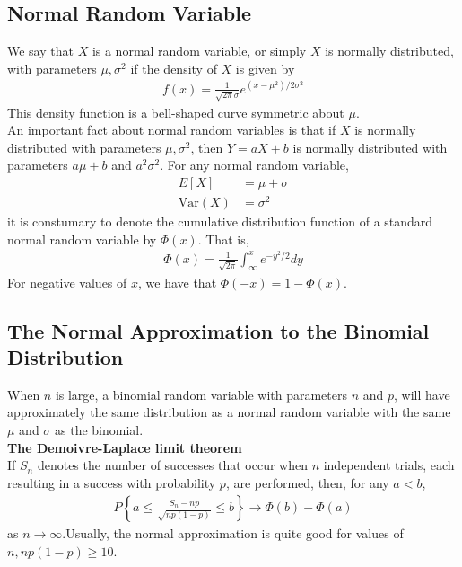 \documentclass[a4paper]{article}
\begin{document}
\subsection{Normal Random Variable} %
\label{sub:Normal Random Variable}
We say that $X$ is a normal random variable, or simply $X$ is normally distributed, with parameters $\mu,\sigma^2$ if the density of $X$ is given by
\begin{align}
  f(x) = \frac{1}{\sqrt{2 \pi}\sigma} e^{(x-\mu^2)/2\sigma^2}
\end{align}
This density function is a bell-shaped curve symmetric about $\mu$. \\
An important fact about normal random variables is that if $X$ is normally distributed with parameters $\mu,\sigma^2$, then $Y = aX+b$ is normally distributed with parameters $a\mu+b$ and $a^2\sigma^2$.
For any normal random variable,
\begin{align}
  E[X] & = \mu + \sigma \\
  \text{Var}(X) & = \sigma^2
\end{align}
it is constumary to denote the cumulative distribution function of a standard normal random variable by $\Phi(x)$. That is,
\begin{align}
  \Phi(x) = \frac{1}{\sqrt{2\pi}}\int_{\infty}^{x} e^{-y^2/2} dy
\end{align}
For negative values of $x$, we have that $\Phi(-x)=1-\Phi(x)$.
\subsection{The Normal Approximation to the Binomial Distribution} %
\label{sub:The Normal Approximation to the Binomial Distribution}
When $n$ is large, a binomial random variable with parameters $n$ and $p$, will have approximately the same distribution as a normal random variable with the same $\mu$ and $\sigma$ as the binomial. \\
{\bf The Demoivre-Laplace limit theorem } \\
If $S_n$ denotes the number of successes that occur when $n$ independent trials, each resulting in a success with probability $p$, are performed, then, for any $a<b$,
\begin{align}
  P\left\{ a \leq \frac{S_n -np}{\sqrt{np(1-p)}} \leq b \right\} \rightarrow \Phi(b)-\Phi(a)
\end{align}
as $n \rightarrow \infty$.Usually, the normal approximation is quite good for values of $n, np(1-p) \geq 10$.
\end{document}
